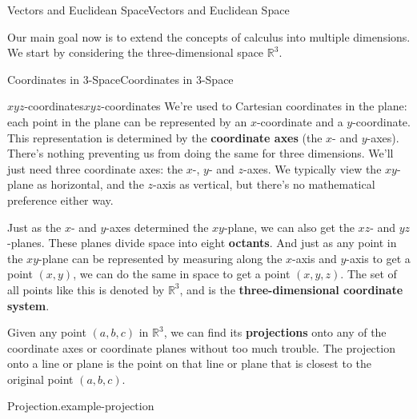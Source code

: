 \documentclass[10pt,]{book}
\newcommand{\terminology}[1]{\textbf{#1}}
\numberwithin{equation}{section}
\newcommand{\RR}{\mathbb{R}}
\begin{document}
\begin{chapterptx}{Vectors and Euclidean Space}{}{Vectors and Euclidean Space}{}{}\label{vectors-space-geometry}
\begin{introduction}{}%
\hypertarget{p-844}{}%
Our main goal now is to extend the concepts of calculus into multiple dimensions. We start by considering the three-dimensional space \(\RR^{3}\).%
\end{introduction}%
%
%
\typeout{************************************************}
\typeout{************************************************}
%
\begin{sectionptx}{Coordinates in 3-Space}{}{Coordinates in 3-Space}{}{}\label{section-coordinates-in-3-space}
%
%
\typeout{************************************************}
\typeout{************************************************}
%
\begin{subsectionptx}{\(xyz\)-coordinates}{}{\(xyz\)-coordinates}{}{}\label{xyz-coordinates}
\hypertarget{p-845}{}%
We're used to Cartesian coordinates in the plane: each point in the plane can be represented by an \(x\)-coordinate and a \(y\)-coordinate. This representation is determined by the \terminology{coordinate axes} (the \(x\)- and \(y\)-axes). There's nothing preventing us from doing the same for three dimensions. We'll just need three coordinate axes: the \(x\)-, \(y\)- and \(z\)-axes. We typically view the \(xy\)-plane as horizontal, and the \(z\)-axis as vertical, but there's no mathematical preference either way.%
\par
\hypertarget{p-846}{}%
Just as the \(x\)- and \(y\)-axes determined the \(xy\)-plane, we can also get the \(xz\)- and \(yz\)-planes. These planes divide space into eight \terminology{octants}. And just as any point in the \(xy\)-plane can be represented by measuring along the \(x\)-axis and \(y\)-axis to get a point \((x,y)\), we can do the same in space to get a point \((x,y,z)\). The set of all points like this is denoted by \(\RR^{3}\), and is the \terminology{three-dimensional coordinate system}.%
\par
\hypertarget{p-847}{}%
Given any point \((a,b,c)\) in \(\RR^{3}\), we can find its \terminology{projections} onto any of the coordinate axes or coordinate planes without too much trouble. The projection onto a line or plane is the point on that line or plane that is closest to the original point \((a,b,c)\).%
\begin{example}{Projection.}{example-projection}%

\end{example}
\end{subsectionptx}
\end{sectionptx}
\end{chapterptx}
\end{document}
